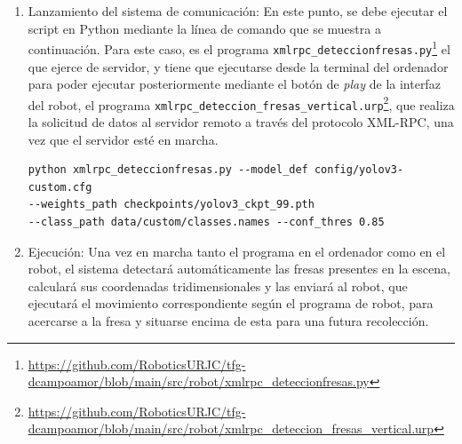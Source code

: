 \begin{enumerate}
  \item Lanzamiento del sistema de comunicación: En este punto, se debe ejecutar el script en Python mediante la línea de comando que se muestra a continuación. Para este caso, es el programa \verb|xmlrpc_deteccionfresas.py|\footnote{\url{https://github.com/RoboticsURJC/tfg-dcampoamor/blob/main/src/robot/xmlrpc_deteccionfresas.py}} el que ejerce de servidor, y tiene que ejecutarse desde la terminal del ordenador para poder ejecutar posteriormente mediante el botón de \textit{play} de la interfaz del robot, el programa \verb|xmlrpc_deteccion_fresas_vertical.urp|\footnote{\url{https://github.com/RoboticsURJC/tfg-dcampoamor/blob/main/src/robot/xmlrpc_deteccion_fresas_vertical.urp}}, que realiza la solicitud de datos al servidor remoto a través del protocolo XML-RPC, una vez que el servidor esté en marcha.
  
\small
\begin{verbatim}
python xmlrpc_deteccionfresas.py --model_def config/yolov3-custom.cfg 
--weights_path checkpoints/yolov3_ckpt_99.pth 
--class_path data/custom/classes.names --conf_thres 0.85 
\end{verbatim}  
\normalsize
    

  \item Ejecución: Una vez en marcha tanto el programa en el ordenador como en el robot, el sistema detectará automáticamente las fresas presentes en la escena, calculará sus coordenadas tridimensionales y las enviará al robot, que ejecutará el movimiento correspondiente según el programa de robot, %
para acercarse a la fresa y situarse encima de esta para una futura recolección.
      
\end{enumerate}

